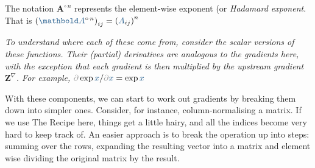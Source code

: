 \documentclass{pca}
\newenvironment{aside}{
	\setlength{\leftskip}{1em}\par\itshape
}{
	
	\setlength{\leftskip}{0em}\par
}
\newcommand{\bc}[1]{{\color{my-blue} #1}}
\newcommand{\kc}[1]{{\color{my-gray} #1}}
\newcommand{\mbA}{\mathbold A}
\newcommand{\mbZ}{\mathbold Z}
\newcommand{\kp}{\kc{\partial}}
\theoremstyle{theorem}
\theoremstyle{definition}
\theoremstyle{proof}
\begin{document}
The notation $\mbA^{\circ \,n}$ represents the element-wise exponent (or \emph{Hadamard exponent}. That is $\left (\bc{\mbA}^{\circ \, n} \right)_{ij} = \left ( \bc{A}_{ij} \right)^n$

\begin{aside}To understand where each of these come from, consider the scalar versions of these functions. Their (partial) derivatives are analogous to the gradients here, with the exception that each gradient is then multiplied by the upstream gradient $\mbZ^\nabla$. For example, $\kp \exp \bc{x} /\kp \bc{x} = \exp \bc{x} $
\end{aside}

With these components, we can start to work out gradients by breaking them down into simpler ones. Consider, for instance, column-normalising a matrix. If we use The Recipe here, things get a little hairy, and all the indices become very hard to keep track of. An easier approach is to break the operation up into steps: summing over the rows, expanding the resulting vector into a matrix and element wise dividing the original matrix by the result.
\end{document}
